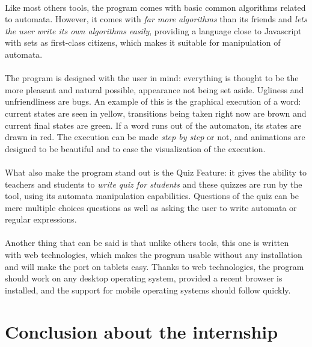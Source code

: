 \documentclass{article}
\begin{document}
\begin{sloppypar}
   
\paragraph{}
Like most others tools, the program comes with basic common algorithms related to automata. However, it comes with {\em far more algorithms} than its friends and {\em lets the user write its own algorithms easily}, providing a language close to Javascript with sets as first-class citizens, which makes it suitable for manipulation of automata.

   
\paragraph{}
The program is designed with the user in mind: everything is thought to be the more pleasant and natural possible, appearance not being set aside. Ugliness and unfriendliness are bugs. An example of this is the graphical execution of a word: current states are seen in yellow, transitions being taken right now are brown and current final states are green. If a word runs out of the automaton, its states are drawn in red. The execution can be made {\em step by step} or not, and animations are designed to be beautiful and to ease the visualization of the execution.

   
\paragraph{}
What also make the program stand out is the Quiz Feature: it gives the ability to teachers and students to {\em write quiz for students} and these quizzes are run by the tool, using its automata manipulation capabilities. Questions of the quiz can be mere multiple choices questions as well as asking the user to write automata or regular expressions.
   
   
\paragraph{}
Another thing that can be said is that unlike others tools, this one is written with web technologies, which makes the program usable without any installation and will make the port on tablets easy. Thanks to web technologies, the program should work on any desktop operating system, provided a recent browser is installed, and the support for mobile operating systems should follow quickly.




\section{ Conclusion about the internship}



\end{sloppypar}
\end{document}
